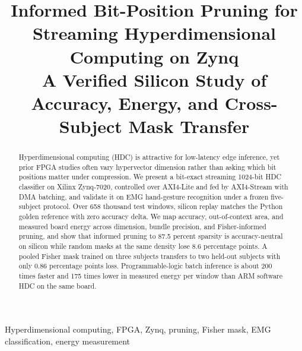 \documentclass[conference]{IEEEtran}
\begin{document}
\title{Informed Bit-Position Pruning for Streaming Hyperdimensional Computing on Zynq\\
{\footnotesize A Verified Silicon Study of Accuracy, Energy, and Cross-Subject Mask Transfer}
}

\author{
\and
{}
}

\maketitle

\begin{abstract}
Hyperdimensional computing (HDC) is attractive for low-latency edge inference, yet
prior FPGA studies often vary hypervector dimension rather than asking which bit
positions matter under compression.
We present a bit-exact streaming 1024-bit HDC classifier on Xilinx Zynq-7020,
controlled over AXI4-Lite and fed by AXI4-Stream with DMA batching, and validate it
on EMG hand-gesture recognition under a frozen five-subject protocol.
Over 658 thousand test windows, silicon replay matches the Python golden reference
with zero accuracy delta.
We map accuracy, out-of-context area, and measured board energy across dimension,
bundle precision, and Fisher-informed pruning, and show that informed pruning to
87.5 percent sparsity is accuracy-neutral on silicon while random masks at the same
density lose 8.6 percentage points.
A pooled Fisher mask trained on three subjects transfers to two held-out subjects with
only 0.86 percentage points loss.
Programmable-logic batch inference is about 200 times faster and 175 times lower in
measured energy per window than ARM software HDC on the same board.
\end{abstract}

\begin{IEEEkeywords}
Hyperdimensional computing, FPGA, Zynq, pruning, Fisher mask, EMG classification, energy measurement
\end{IEEEkeywords}
\end{document}
